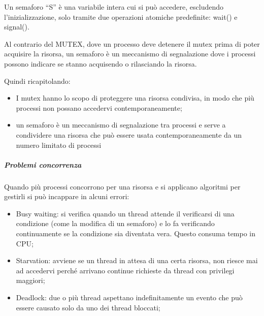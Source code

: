 \documentclass[
]{article}
\providecommand{\tightlist}{%
  \setlength{\itemsep}{0pt}\setlength{\parskip}{0pt}}
\begin{document}
{Un semaforo ``S'' è una variabile intera cui si può accedere,
escludendo l'inizializzazione, solo tramite due operazioni atomiche
predefinite: wait() e signal().}

{}

{Al contrario del MUTEX, dove un processo deve detenere il mutex prima
di poter acquisire la risorsa, un semaforo è un meccanismo di
segnalazione dove i processi possono indicare se stanno acquisendo o
rilasciando la risorsa.}

{Quindi ricapitolando:}

\begin{itemize}
\tightlist
\item
  {I mutex hanno lo scopo di proteggere una risorsa condivisa, in modo
  che più processi non possano accedervi contemporaneamente;}
\item
  {un semaforo è un meccanismo di segnalazione tra processi e serve a
  condividere una risorsa che può essere usata contemporaneamente da un
  numero limitato di processi}
\end{itemize}

{}

\subparagraph{\texorpdfstring{{Problemi
concorrenza}}{Problemi concorrenza}}\label{h.lbij5due5uj}

{Quando più processi concorrono per una risorsa e si applicano algoritmi
per gestirli si può incappare in alcuni errori:}

{}

\begin{itemize}
\tightlist
\item
  {Busy waiting: si verifica quando un thread attende il verificarsi di
  una condizione (come la modifica di un semaforo) e lo fa verificando
  continuamente se la condizione sia diventata vera. Questo consuma
  tempo in CPU;}
\end{itemize}

{}

\begin{itemize}
\tightlist
\item
  {Starvation: avviene se un thread in attesa di una certa risorsa, non
  riesce mai ad accedervi perché arrivano continue richieste da thread
  con privilegi maggiori;}
\end{itemize}

{}

\begin{itemize}
\tightlist
\item
  {Deadlock: due o più thread aspettano indefinitamente un evento che
  può essere causato solo da uno dei thread bloccati;}
\end{itemize}
\end{document}
